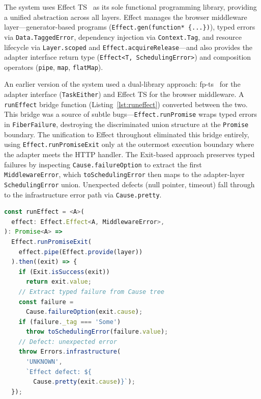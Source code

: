 \documentclass[conference]{IEEEtran}
\begin{document}
The system uses Effect TS~\cite{effect-ts} as its sole functional programming library, providing a unified abstraction across all layers. Effect manages the browser middleware layer---generator-based programs (\texttt{Effect.gen(function*~\{...\})}), typed errors via \texttt{Data.TaggedError}, dependency injection via \texttt{Context.Tag}, and resource lifecycle via \texttt{Layer.scoped} and \texttt{Effect.acquireRelease}---and also provides the adapter interface return type (\texttt{Effect<T, SchedulingError>}) and composition operators (\texttt{pipe}, \texttt{map}, \texttt{flatMap}).

An earlier version of the system used a dual-library approach: fp-ts~\cite{fp-ts} for the adapter interface (\texttt{TaskEither}) and Effect TS for the browser middleware. A \texttt{runEffect} bridge function (Listing~\ref{lst:runeffect}) converted between the two. This bridge was a source of subtle bugs---\texttt{Effect.runPromise} wraps typed errors in \texttt{FiberFailure}, destroying the discriminated union structure at the \texttt{Promise} boundary. The unification to Effect throughout eliminated this bridge entirely, using \texttt{Effect.runPromiseExit} only at the outermost execution boundary where the adapter meets the HTTP handler. The Exit-based approach preserves typed failures by inspecting \texttt{Cause.failureOption} to extract the first \texttt{MiddlewareError}, which \texttt{toSchedulingError} then maps to the adapter-layer \texttt{SchedulingError} union. Unexpected defects (null pointer, timeout) fall through to the infrastructure error path via \texttt{Cause.pretty}.

\begin{lstlisting}[language=TypeScript,caption={The \texttt{runEffect} execution boundary: Effect programs to Promise via Exit inspection (historical bridge to fp-ts \texttt{TaskEither} eliminated during unification)},label={lst:runeffect}]
const runEffect = <A>(
  effect: Effect.Effect<A, MiddlewareError>,
): Promise<A> =>
  Effect.runPromiseExit(
    effect.pipe(Effect.provide(layer))
  ).then((exit) => {
    if (Exit.isSuccess(exit))
      return exit.value;
    // Extract typed failure from Cause tree
    const failure =
      Cause.failureOption(exit.cause);
    if (failure._tag === 'Some')
      throw toSchedulingError(failure.value);
    // Defect: unexpected error
    throw Errors.infrastructure(
      'UNKNOWN',
      `Effect defect: ${
        Cause.pretty(exit.cause)}`);
  });
\end{lstlisting}
\end{document}
